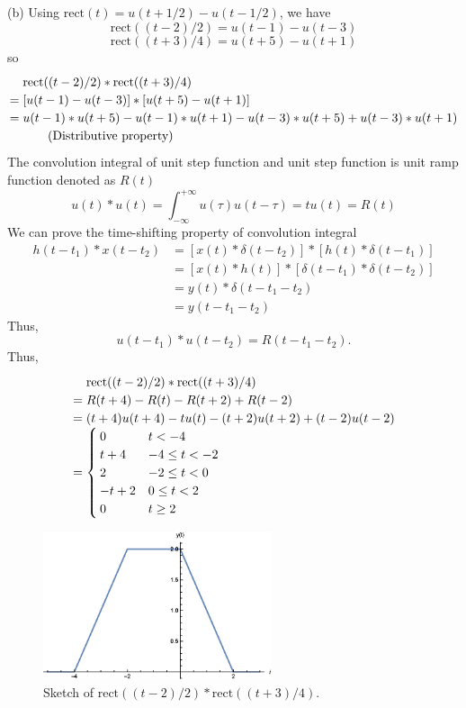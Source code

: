 \documentclass[a4paper]{article}
\begin{document}
(b) Using $\text{rect}(t)=u(t+1/2)-u(t-1/2)$, we have
$$\text{rect}((t-2)/2)=u(t-1)-u(t-3)$$
$$\text{rect}((t+3)/4)=u(t+5)-u(t+1)$$
so
\[\arraycolsep=1.4pt\def\arraystretch{1.2}
\begin{array}{ll}
    &\text{rect}((t-2)/2)*\text{rect}((t+3)/4)\\
    =&[u(t-1)-u(t-3)]*[u(t+5)-u(t+1)]\\
    =&u(t-1)*u(t+5)-u(t-1)*u(t+1)-u(t-3)*u(t+5)+u(t-3)*u(t+1)\\
    &\qquad\text{(Distributive property)}
\end{array}
\]
The convolution integral of unit step function and unit step function is unit ramp function denoted as $R(t)$
$$u(t)*u(t)=\int_{-\infty}^{+\infty}u(\tau)u(t-\tau)=tu(t)=R(t)$$
We can prove the time-shifting property of convolution integral
\begin{align*}
    h(t-t_1)*x(t-t_2)&=[x(t)*\delta(t-t_2)]*[h(t)*\delta(t-t_1)]\\
    &=[x(t)*h(t)]*[\delta(t-t_1)*\delta(t-t_2)]\\
    &=y(t)*\delta(t-t_1-t_2)\\
    &=y(t-t_1-t_2)
\end{align*}
Thus,
$$u(t-t_1)*u(t-t_2)=R(t-t_1-t_2).$$
Thus,
\[\arraycolsep=1.4pt\def\arraystretch{1.2}
\begin{array}{ll}
    &\text{rect}((t-2)/2)*\text{rect}((t+3)/4)\\
    =&R(t+4)-R(t)-R(t+2)+R(t-2)\\
    =&(t+4)u(t+4)-tu(t)-(t+2)u(t+2)+(t-2)u(t-2)\\
    =&%
        \begin{cases}
            0&{t<-4}\\
            t+4&{-4\leq t<-2}\\
            2&{-2\leq t<0}\\
            -t+2&{0\leq t<2}\\
            0&{t\geq2}
        \end{cases}
\end{array}
\]
\begin{figure}[H]
    \begin{center}
        \includegraphics[width=0.6\textwidth]{4(b).eps}
    \end{center}
    \caption{Sketch of $\text{rect}((t-2)/2)*\text{rect}((t+3)/4)$.}
\end{figure}
\end{document}
